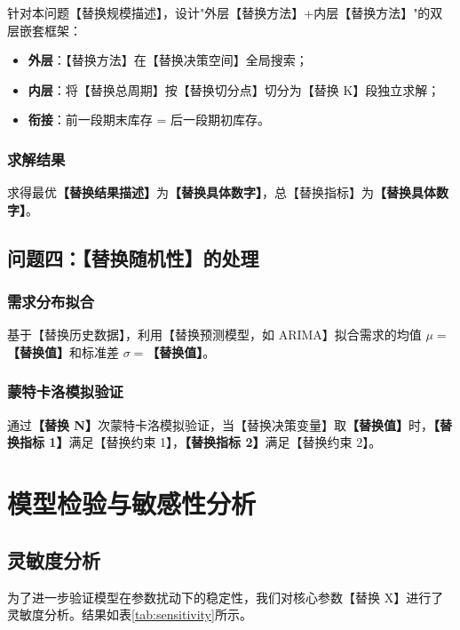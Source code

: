 \documentclass[12pt,a4paper,fontset=fandol]{ctexart}
\newcommand{\res}[1]{\textbf{#1}}
\begin{document}
针对本问题【替换规模描述】，设计"外层【替换方法】+内层【替换方法】"的双层嵌套框架：
\begin{itemize}
    \item \textbf{外层}：【替换方法】在【替换决策空间】全局搜索；
    \item \textbf{内层}：将【替换总周期】按【替换切分点】切分为【替换 K】段独立求解；
    \item \textbf{衔接}：前一段期末库存 = 后一段期初库存。
\end{itemize}

\subsubsection{求解结果}

求得最优\res{【替换结果描述】}为\res{【替换具体数字】}，总【替换指标】为\res{【替换具体数字】}。

\subsection{问题四：【替换随机性】的处理}

\subsubsection{需求分布拟合}

基于【替换历史数据】，利用【替换预测模型，如 ARIMA】拟合需求的均值 $\mu=$\res{【替换值】}和标准差 $\sigma=$\res{【替换值】}。

\subsubsection{蒙特卡洛模拟验证}

通过\res{【替换 N】}次蒙特卡洛模拟验证，当【替换决策变量】取\res{【替换值】}时，\res{【替换指标 1】}满足【替换约束 1】，\res{【替换指标 2】}满足【替换约束 2】。

\section{模型检验与敏感性分析}

\subsection{灵敏度分析}

为了进一步验证模型在参数扰动下的稳定性，我们对核心参数【替换 X】进行了灵敏度分析。结果如表\ref{tab:sensitivity}所示。
\end{document}
